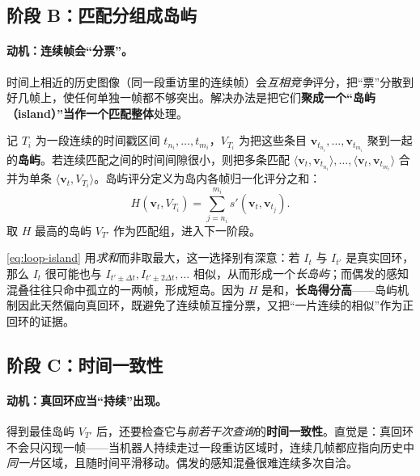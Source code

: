 \subsection{阶段 B：匹配分组成岛屿}
\label{sec:loop-stageB}

\paragraph{动机：连续帧会“分票”。}
时间上相近的历史图像（同一段重访里的连续帧）会\emph{互相竞争}评分，把“票”分散到好几帧上，使任何单独一帧都不够突出\cite{galvez2012bags}。解决办法是把它们\textbf{聚成一个“岛屿（island）”当作一个匹配整体}处理。

\begin{definition}[岛屿与岛屿评分]\label{def:loop-island}
记 $T_i$ 为一段连续的时间戳区间 $t_{n_i},\dots,t_{m_i}$，$V_{T_i}$ 为把这些条目 $\boldsymbol v_{t_{n_i}},\dots,\boldsymbol v_{t_{m_i}}$ 聚到一起的\textbf{岛屿}。若连续匹配之间的时间间隙很小，则把多条匹配 $\langle\boldsymbol v_t,\boldsymbol v_{t_{n_i}}\rangle,\dots,\langle\boldsymbol v_t,\boldsymbol v_{t_{m_i}}\rangle$ 合并为单条 $\langle\boldsymbol v_t,V_{T_i}\rangle$。岛屿评分定义为岛内各帧归一化评分之和\cite{galvez2012bags}：
\begin{equation}
  H(\boldsymbol v_t,V_{T_i})=\sum_{j=n_i}^{m_i} s'(\boldsymbol v_t,\boldsymbol v_{t_j}).
  \label{eq:loop-island}
\end{equation}
取 $H$ 最高的岛屿 $V_{T'}$ 作为匹配组，进入下一阶段。
\end{definition}

\begin{insight}[岛屿天然偏好真回环]\label{ins:loop-island}
\cref{eq:loop-island} 用\emph{求和}而非取最大，这一选择别有深意\cite{galvez2012bags}：若 $I_t$ 与 $I_{t'}$ 是真实回环，那么 $I_t$ 很可能也与 $I_{t'\pm\Delta t},I_{t'\pm2\Delta t},\dots$ 相似，从而形成一个\emph{长岛屿}；而偶发的感知混叠往往只命中孤立的一两帧，形成短岛。因为 $H$ 是和，\textbf{长岛得分高}——岛屿机制因此天然偏向真回环，既避免了连续帧互撞分票，又把“一片连续的相似”作为正回环的证据。
\end{insight}

\subsection{阶段 C：时间一致性}
\label{sec:loop-stageC}

\paragraph{动机：真回环应当“持续”出现。}
得到最佳岛屿 $V_{T'}$ 后，还要检查它与\emph{前若干次查询}的\textbf{时间一致性}\cite{galvez2012bags}。直觉是：真回环不会只闪现一帧——当机器人持续走过一段重访区域时，连续几帧都应指向历史中\emph{同一片}区域，且随时间平滑移动。偶发的感知混叠很难连续多次自洽。

